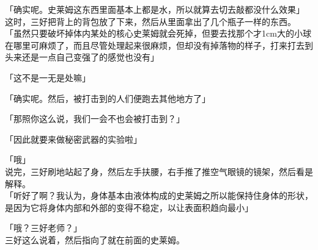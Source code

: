 「确实呢。史莱姆这东西里面基本上都是水，所以就算去切去敲都没什么效果」\\

这时，三好把背上的背包放了下来，然后从里面拿出了几个瓶子一样的东西。\\

「虽然只要破坏掉体内某处的核心史莱姆就会死掉，但要去找那个才1cm大的小球在哪里可麻烦了，而且尽管处理起来很麻烦，但却没有掉落物的样子，打来打去到头来还是一点自己变强了的感觉也没有」

「这不是一无是处嘛」

「确实呢。然后，被打击到的人们便跑去其他地方了」

「那照你这么说，我们一会不也会被打击到？」

「因此就要来做秘密武器的实验啦」

「哦」\\

说完，三好刷地站起了身，然后左手扶腰，右手推了推空气眼镜的镜架，然后看是解释。\\

「听好了啊？我认为，身体基本由液体构成的史莱姆之所以能保持住身体的形状，是因为它将身体内部和外部的变得不稳定，以让表面积趋向最小」

「哦？三好老师？」\\

三好这么说着，然后指向了就在前面的史莱姆。

